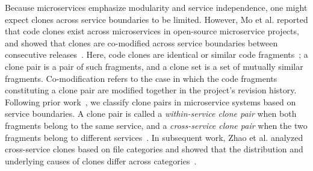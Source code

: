\documentclass[conference]{IEEEtran}
\begin{document}
Because microservices emphasize modularity and service independence, one might expect clones across service boundaries to be limited. 
However, Mo et al. reported that code clones exist across
microservices in open-source microservice projects, and showed that
clones are co-modified across service boundaries between consecutive releases~\cite{Mo2021ESEM}.
Here, code clones are identical or similar code fragments~\cite{RoyCordy2009}; a clone pair is a pair of such fragments, and a clone set is a set of mutually similar fragments.
Co-modification refers to the case in which the code fragments
constituting a clone pair are modified together in the project's revision history.
Following prior work~\cite{Mo2021ESEM}, we classify clone
pairs in microservice systems based on service boundaries. 
A clone pair is called a \emph{within-service clone pair} when both fragments belong to the same service, and a \emph{cross-service clone pair} when the two fragments belong to different services~\cite{Mo2021ESEM}.
In subsequent work, Zhao et al. analyzed cross-service
clones based on file categories and showed that the distribution and
underlying causes of clones differ across categories~\cite{Zhao2022ICPC}.
%
\end{document}
